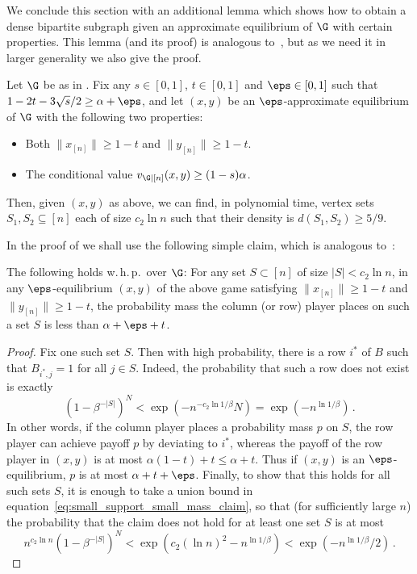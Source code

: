 We conclude this section with an additional lemma 
which shows how to obtain a dense bipartite subgraph given an
approximate equilibrium of $\G$ with certain properties.  This lemma
(and its proof) is analogous to~\cite[Lemma 5.2]{HK11}, but as we need
it in larger generality we also give the proof.

\begin{lemma}
  \label{lem:dense-subgraph}
  Let $\G$ be as in .  Fix any $s \in
  [0,1]$, $t \in [0,1]$ and $\eps \in [0,1]$ such that $1 - 2t - 3
  \sqrt{s}/2 \ge \alpha + \eps$, and let $(x, y)$ be an
  $\eps$-approximate equilibrium of $\G$ with the following two
  properties:
  \begin{itemize}
  \item Both $\|x_{[n]}\| \ge 1-t$ and $\|y_{[n]}\|
    \ge 1-t$.
  \item The conditional value $v_{\G|[n]}(x,y) \ge (1-s)\alpha$.
  \end{itemize}
  Then, given $(x,y)$ as above, we can find, in polynomial time, vertex sets
  $S_1, S_2 \subseteq [n]$ each of size $c_2 \ln n$ such that their density is $d(S_1,S_2)\ge 5/9$.%
\end{lemma}

In the proof of  we shall use the
following simple claim, which is analogous to~\cite[Claim 5.3]{HK11}:

\begin{claim}
  \label{claim:small_support_means_small_mass}
  The following holds w.\,h.\,p.\ over $\G$: For any set $S\subset[n]$ of size $|S| < c_2 \ln n$,
  in any $\eps$-equilibrium $(x,y)$ of the above
  game satisfying $\|x_{[n]}\| \ge 1-t$ and $\|y_{[n]}\| \ge 1-t$, the
  probability mass the column (or row) player places on such a set
  $S$ is less than $\alpha + \eps + t$.
\end{claim}

\begin{proof}
  Fix one such set $S$. Then with high
  probability, there is a row $i^*$ of $B$ such that $B_{i^*,j} = 1$ for all
  $j \in S$.  Indeed, the probability that such a row does not exist is
  exactly
  \begin{equation}\label{eq:small_support_small_mass_claim}
  \left(1 - \beta^{-|S|}\right)^N < \exp(-n^{-c_2 \ln 1/\beta} N) =
  \exp(-n^{\ln 1/\beta})\,.
  \end{equation} In other words, if the column player places a probability mass
  $p$ on $S$, the row player can achieve payoff $p$ by deviating to
  $i^*$, whereas the payoff of the row player in $(x,y)$ is at most
  $\alpha (1-t) + t \le \alpha + t$.  Thus if $(x,y)$ is an
  $\eps$-equilibrium, $p$ is at most $\alpha + t + \eps$. Finally, to show that this holds for all such sets $S$, it is enough to take a union bound in equation~\eqref{eq:small_support_small_mass_claim}, so that (for sufficiently large $n$) the probability that the claim does not hold for at least one set $S$ is at most
  $$n^{c_2\ln n}\left(1 - \beta^{-|S|}\right)^N < 
  \exp(c_2(\ln n)^2-n^{\ln 1/\beta}) < \exp(-n^{\ln 1/\beta}/2)\,.$$
\end{proof}



